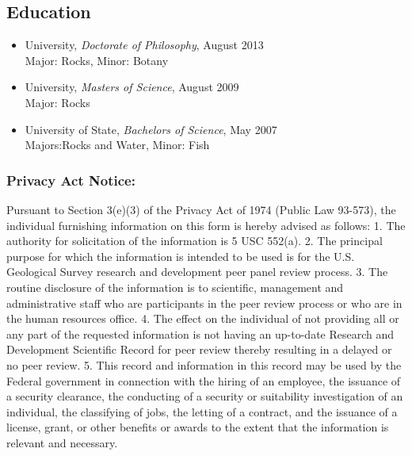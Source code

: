 \subsection{Education}

\begin{itemize}
\item University, \textit{Doctorate of Philosophy}, August 2013\\
Major: Rocks, Minor: Botany
\item  University, \textit{Masters of Science}, August 2009\\
Major: Rocks
\item University of State, \textit{Bachelors of Science}, May 2007\\
Majors:Rocks and Water, Minor: Fish
\end{itemize}


\subsubsection*{\small{Privacy Act Notice:}}
\vspace{-0.3cm}
\begin{adjustwidth}{0cm}{}
  {\footnotesize
Pursuant to Section 3(e)(3) of the Privacy Act of 1974 (Public Law
93-573), the individual furnishing information on this form is hereby
advised as follows: 1. The authority for solicitation of the
information is 5 USC 552(a). 2. The principal purpose for which the
information is intended to be used is for the U.S. Geological Survey
research and development peer panel review process. 3. The routine
disclosure of the information is to scientific, management and
administrative staff who are participants in the peer review process
or who are in the human resources office. 4. The effect on the
individual of not providing all or any part of the requested
information is not having an up-to-date Research and Development
Scientific Record for peer review thereby resulting in a delayed or no
peer review. 5. This record and information in this record may be used
by the Federal government in connection with the hiring of an
employee, the issuance of a security clearance, the conducting of a
security or suitability investigation of an individual, the
classifying of jobs, the letting of a contract, and the issuance of a
license, grant, or other benefits or awards to the extent that the
information is relevant and necessary.
}
\end{adjustwidth}
